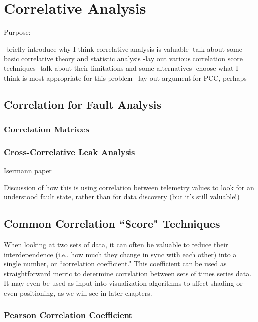 \chapter{Correlative Analysis}

Purpose:

-briefly introduce why I think correlative analysis is valuable
-talk about some basic correlative theory and statistic analysis
-lay out various correlation score techniques
-talk about their limitations and some alternatives
-choose what I think is most appropriate for this problem
--lay out argument for PCC, perhaps

\section{Correlation for Fault Analysis}

\subsection{Correlation Matrices}



\subsection{Cross-Correlative Leak Analysis}

Isermann paper

Discussion of how this is using correlation between telemetry values to look for an understood fault state, rather than for data discovery (but it's still valuable!)

\section{Common Correlation ``Score" Techniques}

When looking at two sets of data, it can often be valuable to reduce their interdependence (i.e., how much they change in sync with each other) into a single number, or ``correlation coefficient." This coefficient can be used as straightforward metric to determine correlation between sets of times series data. It may even be used as input into visualization algorithms to affect shading or even positioning, as we will see in later chapters.

\subsection{Pearson Correlation Coefficient}

